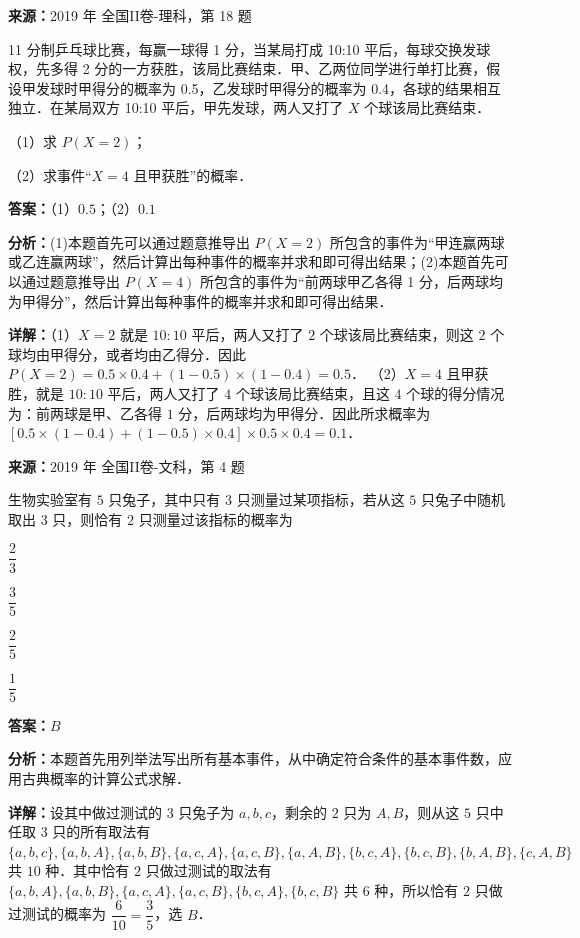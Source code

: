 \begin{question}[points=12]
\textbf{来源：}2019 年 全国II卷-理科，第 18 题\par
11 分制乒乓球比赛，每赢一球得 1 分，当某局打成 10:10 平后，每球交换发球权，先多得 2 分的一方获胜，该局比赛结束．甲、乙两位同学进行单打比赛，假设甲发球时甲得分的概率为 0.5，乙发球时甲得分的概率为 0.4，各球的结果相互独立．在某局双方 10:10 平后，甲先发球，两人又打了 $X$ 个球该局比赛结束．

（1）求 $P(X=2)$；

（2）求事件“$X=4$ 且甲获胜”的概率．
\begin{solution}
\textbf{答案：}（1）$0.5$；（2）$0.1$

\textbf{分析：}(1)本题首先可以通过题意推导出 $P(X=2)$ 所包含的事件为“甲连赢两球或乙连赢两球”，然后计算出每种事件的概率并求和即可得出结果；(2)本题首先可以通过题意推导出 $P(X=4)$ 所包含的事件为“前两球甲乙各得 1 分，后两球均为甲得分”，然后计算出每种事件的概率并求和即可得出结果．

\textbf{详解：}（1）$X=2$ 就是 $10:10$ 平后，两人又打了 $2$ 个球该局比赛结束，则这 $2$ 个球均由甲得分，或者均由乙得分．因此 $P(X=2)=0.5\times0.4+(1-0.5)\times(1-0.4)=0.5$．
（2）$X=4$ 且甲获胜，就是 $10:10$ 平后，两人又打了 $4$ 个球该局比赛结束，且这 $4$ 个球的得分情况为：前两球是甲、乙各得 $1$ 分，后两球均为甲得分．因此所求概率为 $[0.5\times(1-0.4)+(1-0.5)\times0.4]\times0.5\times0.4=0.1$．
\end{solution}
\end{question}

\begin{question}[points=5]
\textbf{来源：}2019 年 全国II卷-文科，第 4 题\par
生物实验室有 $5$ 只兔子，其中只有 $3$ 只测量过某项指标，若从这 $5$ 只兔子中随机取出 $3$ 只，则恰有 $2$ 只测量过该指标的概率为
\begin{choices}
  \item $\dfrac{2}{3}$
  \item $\dfrac{3}{5}$
  \item $\dfrac{2}{5}$
  \item $\dfrac{1}{5}$
\end{choices}
\begin{solution}
\textbf{答案：}$B$

\textbf{分析：}本题首先用列举法写出所有基本事件，从中确定符合条件的基本事件数，应用古典概率的计算公式求解．

\textbf{详解：}设其中做过测试的 $3$ 只兔子为 $a,b,c$，剩余的 $2$ 只为 $A,B$，则从这 $5$ 只中任取 $3$ 只的所有取法有 $\{a,b,c\},\{a,b,A\},\{a,b,B\},\{a,c,A\},\{a,c,B\},\{a,A,B\},\{b,c,A\},\{b,c,B\},\{b,A,B\},\{c,A,B\}$ 共 $10$ 种．其中恰有 $2$ 只做过测试的取法有 $\{a,b,A\},\{a,b,B\},\{a,c,A\},\{a,c,B\},\{b,c,A\},\{b,c,B\}$ 共 $6$ 种，所以恰有 $2$ 只做过测试的概率为 $\dfrac{6}{10}=\dfrac{3}{5}$，选 $B$．
\end{solution}
\end{question}

